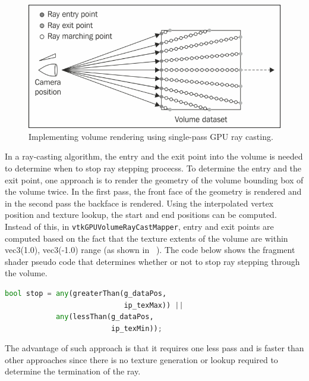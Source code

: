 \begin{figure}[ht]
  \centering
  \includegraphics[width=\columnwidth]{raycasting.jpg}
  \caption{Implementing volume rendering using single-pass GPU ray casting.}
  \label{fig:raycasting}
\end{figure}%

In a ray-casting algorithm, the entry and the exit point into the volume is
needed to determine when to stop ray stepping procecss. To determine the entry and
the exit point, one approach is to render the geometry of the volume bounding
box of the volume twice. In the first pass, the front face of the geometry is
rendered and in the second pass the backface is rendered.
Using the interpolated vertex position and
texture lookup, the start and end positions can be computed. Instead of this, in
\texttt{vtkGPUVolumeRayCastMapper}, entry and exit points are computed based on
the fact that the texture extents of the volume are within vec3(1.0), vec3(-1.0)
range (as shown in ~). The code below shows the
fragment shader pseudo code that determines whether or not to stop ray stepping
through the volume.

\begin{center}
  \begin{lstlisting}[language=Python, caption={Ray stop determination},
                     captionpos=b, frame=single, breaklines=true]
bool stop = any(greaterThan(g_dataPos,
                            ip_texMax)) ||
            any(lessThan(g_dataPos,
                         ip_texMin));
  \end{lstlisting}
\end{center}

The advantage of such approach is that it requires one less pass and is faster
than other approaches since there is no texture generation or lookup required
to determine the termination of the ray.



